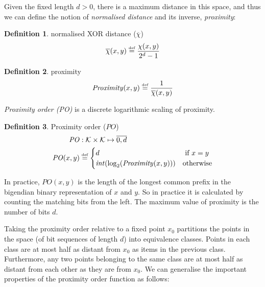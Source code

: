 \documentclass[a4paper,10pt,fullpage]{article}
\numberwithin{equation}{section}
\newcommand\PO{\mathit{PO}}
\newcommand\Keys{\mathcal{K}}
\newcommand\defeq{\overset{\textrm{\tiny  def}}{=}}
\theoremstyle{definition}
\newtheorem{definition}{Definition}[section]
\begin{document}
Given the fixed length $d>0$, there is a maximum distance in this space, and thus we can define the notion of \emph{normalised distance} and its inverse, \emph{proximity}:

\begin{definition}{normalised XOR distance ($\overline{\chi}$)}\label{def:normalisedxor}
\begin{equation}
\overline{\chi}(x, y) \defeq \frac{\chi(x,y)}{2^d-1}
\end{equation}
\end{definition}

\begin{definition}{proximity}\label{def:proximity}
\begin{equation}
\mathit{Proximity}(x, y) \defeq \frac{1}{\overline{\chi}(x,y)}
\end{equation}{}
\end{definition}


\emph{Proximity order (PO)} is a discrete logarithmic scaling of proximity.


\begin{definition}{Proximity order ($\PO$)}\label{def:xorPO}
\begin{equation}
\begin{split}
\PO&: \Keys \times\Keys\mapsto\overline{0,d}\\
\PO(x,y) &\defeq 
\begin{cases}
d & \text{ if } x=y\\
\mathit{int}(\log_2(\mathit{Proximity}(x, y)))&\text{otherwise}\\
\end{cases}
\end{split}
\end{equation}
\end{definition}


In practice, $\PO(x,y)$ is the length of the longest common prefix in the bigendian binary representation of $x$ and $y$. So in practice it is calculated by counting the matching bits from the left. The maximum value of proximity is the number of bits $d$.

Taking the proximity order relative to a fixed point $x_0$ partitions the points in
the space (of bit sequences of length $d$) into equivalence classes. Points in each class are at
most half as distant from $x_0$ as items in the previous class. Furthermore, any two points belonging to the same class are at most half as distant from each other as they are from $x_0$. We can generalise the important properties of the proximity order function as follows:
\end{document}

